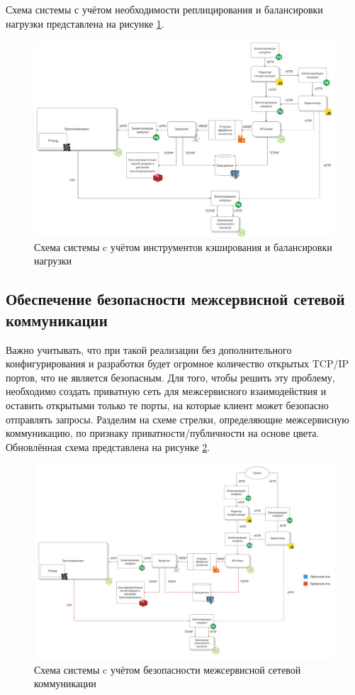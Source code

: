 	Схема системы с учётом необходимости реплицирования и балансировки нагрузки представлена на рисунке \ref{fig:system_scheme_6}.

	\begin{figure}[ht!] 
		\center
		\includegraphics [scale=0.32] {my_folder/images//system_scheme_6}
		\caption{Схема системы c учётом инструментов кэширования и балансировки нагрузки} 
		\label{fig:system_scheme_6}  
	\end{figure}

	\subsection{Обеспечение безопасности межсервисной сетевой коммуникации}

	Важно учитывать, что при такой реализации без дополнительного конфигурирования и разработки будет огромное количество открытых TCP/IP портов, что не является безопасным. Для того, чтобы решить эту проблему, необходимо создать приватную сеть для межсервисного взаимодействия и оставить открытыми только те порты, на которые клиент может безопасно отправлять запросы. Разделим на схеме стрелки, определяющие межсервисную коммуникацию, по признаку приватности/публичности на основе цвета. Обновлённая схема представлена на рисунке \ref{fig:system_scheme_7}.

	\begin{figure}[ht!] 
		\center
		\includegraphics [scale=0.32] {my_folder/images//system_scheme_7}
		\caption{Схема системы c учётом безопасности межсервисной сетевой коммуникации} 
		\label{fig:system_scheme_7}  
	\end{figure}
	
